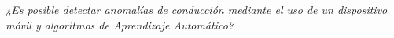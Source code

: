 \begin{center}
\textit{\LARGE{¿Es posible detectar anomal\'{i}as de conducci\'{o}n mediante el uso de un dispositivo móvil y algoritmos de Aprendizaje Autom\'{a}tico?}}
\end{center}
